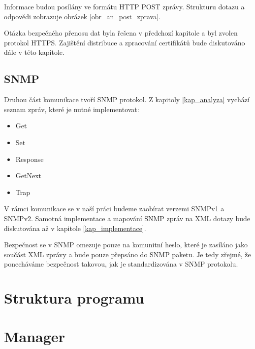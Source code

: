 Informace budou posílány ve formátu HTTP POST zprávy. Strukturu dotazu a odpovědi zobrazuje obrázek \ref{obr_an_post_zprava}.


Otázka bezpečného přenosu dat byla řešena v předchozí kapitole a byl zvolen protokol HTTPS. Zajištění distribuce a zpracování certifikátů bude
diskutováno dále v této kapitole.


\subsection{SNMP}
Druhou část komunikace tvoří SNMP protokol. Z kapitoly \ref{kap_analyza} vychází seznam zpráv, které je nutné implementovat:
\begin{itemize}
	\item Get
	\item Set
	\item Response
	\item GetNext
	\item Trap
\end{itemize}

V rámci komunikace se v naší práci budeme zaobírat verzemi SNMPv1 a SNMPv2. Samotná implementace a mapování SNMP zpráv na XML dotazy
bude diskutována až v kapitole \ref{kap_implementace}.

Bezpečnost se v SNMP omezuje pouze na komunitní heslo, které je zasíláno jako součást XML zprávy a bude pouze přepsáno do SNMP paketu. 
Je tedy zřejmé, že ponecháváme bezpečnost takovou, jak je standardizována v SNMP protokolu.


\section{Struktura programu}
\label{sec_an_struktura_programu}

\section{Manager}
